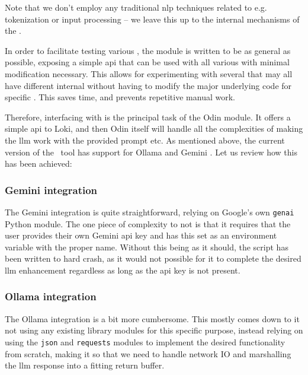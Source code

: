 Note that we don't employ any traditional \acrfull{nlp} techniques related to e.g. tokenization
or input processing -- we leave this up to the internal mechanisms of the
.

In order to facilitate testing various , the module is written to
be as general as possible, exposing a simple \acrshort{api} that can be used
with all various  with minimal modification necessary.
This allows for experimenting with several  that may all
have different internal  without having to modify the major underlying code
for specific . This saves time, and prevents repetitive manual work.

Therefore, interfacing with  is the principal task of the Odin module. It
offers a simple \acrshort{api} to Loki, and then Odin itself will handle all the
complexities of making the \acrshort{llm} work with the provided prompt etc.
As mentioned above, the current version of the \hefe~tool has support for Ollama
and Gemini . Let us review how this has been achieved:

\subsubsection{Gemini integration}

The Gemini integration is quite straightforward, relying on Google's own
\texttt{genai} Python module.
The one piece of complexity to not is that it requires that the user provides
their own Gemini \acrshort{api} key and has this set as an environment variable
with the proper name. Without this being as it should, the script has been
written to hard crash, as it would not possible for it to complete the desired
\acrshort{llm} enhancement regardless as long as the \acrshort{api} key is not
present.

% 

\subsubsection{Ollama integration}

The Ollama integration is a bit more cumbersome. This mostly comes down to it not
using any existing library modules for this specific purpose, instead relying on
using the \texttt{json} and \texttt{requests} modules to implement the desired
functionality from scratch, making it so that we need to handle network IO and
marshalling the \acrshort{llm} response into a fitting return buffer.

